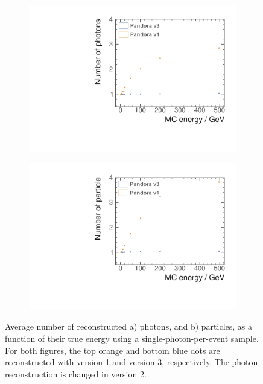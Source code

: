 \begin{figure}[tbph]
\centering
    \begin{subfigure}[b]{0.45\textwidth}
        \includegraphics[width=\textwidth]{photon/SingleN_pedit.pdf}
        \caption{}
        \label{fig:photonSingleN_p}
    \end{subfigure}
    \begin{subfigure}[b]{0.45\textwidth}
        \includegraphics[width=\textwidth]{photon/SingleN_alledit.pdf}
        \caption{}
        \label{fig:photonSingleN_all}
    \end{subfigure}
\caption[Average number of reconstructed photons and reconstructed particles, as a function of their true energy using single photon sample.]
{Average number of reconstructed a) photons, and b) particles, as a function of their true energy using a single-photon-per-event sample. For both figures, the top orange and bottom blue dots are reconstructed with \pandora version 1 and version 3, respectively. The photon reconstruction is changed in \pandora version 2.}
\label{fig:photonSingleN}
\end{figure}

